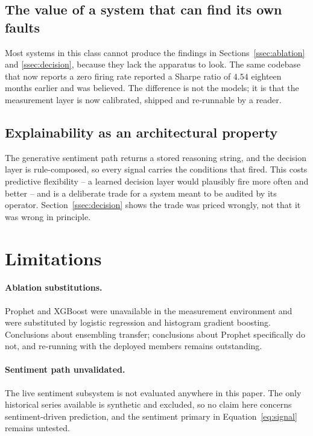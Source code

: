 \documentclass[preprint,12pt,authoryear]{elsarticle}
\begin{document}
\subsection{The value of a system that can find its own faults}

Most systems in this class cannot produce the findings in
Sections~\ref{ssec:ablation} and \ref{ssec:decision}, because they lack the
apparatus to look. The same codebase that now reports a zero firing rate reported
a Sharpe ratio of $4.54$ eighteen months earlier and was believed. The difference
is not the models; it is that the measurement layer is now calibrated, shipped
and re-runnable by a reader.

\subsection{Explainability as an architectural property}

The generative sentiment path returns a stored reasoning string, and the decision
layer is rule-composed, so every signal carries the conditions that fired. This
costs predictive flexibility -- a learned decision layer would plausibly fire
more often and better -- and is a deliberate trade for a system meant to be
audited by its operator. Section~\ref{ssec:decision} shows the trade was priced
wrongly, not that it was wrong in principle.

\section{Limitations}
\label{sec:limitations}

\paragraph{Ablation substitutions.} Prophet and XGBoost were unavailable in the
measurement environment and were substituted by logistic regression and
histogram gradient boosting. Conclusions about ensembling transfer; conclusions
about Prophet specifically do not, and re-running with the deployed members
remains outstanding.

\paragraph{Sentiment path unvalidated.} The live sentiment subsystem is not
evaluated anywhere in this paper. The only historical series available is
synthetic and excluded, so no claim here concerns sentiment-driven prediction,
and the sentiment primary in Equation~\eqref{eq:signal} remains untested.
\end{document}
